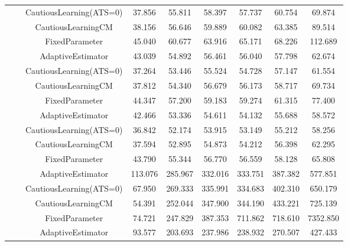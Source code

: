 \begin{table}[!h]
\begin{tabular}[t]{ccccccccc}
 &  & CautiousLearning(ATS=0) & 37.856 & 55.811 & 58.397 & 57.737 & 60.754 & 69.874\\

 &  & CautiousLearningCM & 38.156 & 56.646 & 59.889 & 60.082 & 63.385 & 89.514\\

 & \multirow[t]{-4}{*}{\centering\arraybackslash 1.00} & FixedParameter & 45.040 & 60.677 & 63.916 & 65.171 & 68.226 & 112.689\\
\cmidrule{2-9}
 &  & AdaptiveEstimator & 43.039 & 54.892 & 56.461 & 56.040 & 57.798 & 62.674\\

 &  & CautiousLearning(ATS=0) & 37.264 & 53.446 & 55.524 & 54.728 & 57.147 & 61.554\\

 &  & CautiousLearningCM & 37.812 & 54.340 & 56.679 & 56.173 & 58.717 & 69.734\\

 & \multirow[t]{-4}{*}{\centering\arraybackslash 1.25} & FixedParameter & 44.347 & 57.200 & 59.183 & 59.274 & 61.315 & 77.400\\
\cmidrule{2-9}
 &  & AdaptiveEstimator & 42.466 & 53.336 & 54.611 & 54.132 & 55.688 & 58.572\\

 &  & CautiousLearning(ATS=0) & 36.842 & 52.174 & 53.915 & 53.149 & 55.212 & 58.256\\

 &  & CautiousLearningCM & 37.594 & 52.895 & 54.873 & 54.212 & 56.398 & 62.295\\

\multirow[t]{-28}{*}{\centering\arraybackslash 50} & \multirow[t]{-4}{*}{\centering\arraybackslash 1.50} & FixedParameter & 43.790 & 55.344 & 56.770 & 56.559 & 58.128 & 65.808\\
\cmidrule{1-9}
 &  & AdaptiveEstimator & 113.076 & 285.967 & 332.016 & 333.751 & 387.382 & 577.851\\

 &  & CautiousLearning(ATS=0) & 67.950 & 269.333 & 335.991 & 334.683 & 402.310 & 650.179\\

 &  & CautiousLearningCM & 54.391 & 252.044 & 347.900 & 344.190 & 433.221 & 725.139\\

 & \multirow[t]{-4}{*}{\centering\arraybackslash 0.25} & FixedParameter & 74.721 & 247.829 & 387.353 & 711.862 & 718.610 & 7352.850\\
\cmidrule{2-9}
 &  & AdaptiveEstimator & 93.577 & 203.693 & 237.986 & 238.932 & 270.507 & 427.433\\


\end{tabular}
\end{table}
